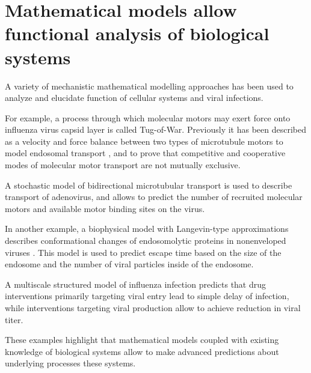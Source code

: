 \section{Mathematical models allow functional analysis of biological systems}

A variety of mechanistic mathematical modelling approaches has been used to analyze and elucidate function of cellular systems and viral infections.

For example, a process through which molecular motors may exert force onto influenza virus capsid layer is called Tug-of-War. Previously it has been described as a velocity and force balance between two types of microtubule motors to model endosomal transport \cite{muller2008tug}, and to prove that competitive and cooperative modes of molecular motor transport are not mutually exclusive.

A stochastic model of bidirectional microtubular transport \cite{gazzola2009stochastic} is used to describe transport of adenovirus, and allows to predict the number of recruited molecular motors and available motor binding sites on the virus.

In another example, a biophysical model with  Langevin-type approximations  describes conformational changes of endosomolytic proteins in nonenveloped viruses \cite{lagache2012modeling}. This model is used to predict escape time based on the size of the endosome and the number of viral particles inside of the endosome.

A multiscale structured model of influenza infection \cite{heldt2013multiscale} predicts that drug interventions primarily targeting viral entry lead to simple delay of infection, while interventions targeting viral production allow to achieve reduction in viral titer.

These examples highlight that mathematical models coupled with existing knowledge of biological systems allow to make advanced predictions about underlying processes these systems.